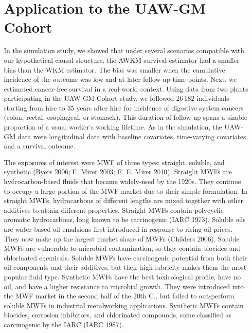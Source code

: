 \documentclass[
  11pt,
]{article}
\begin{document}
\hypertarget{application-to-the-uaw-gm-cohort}{%
\section{Application to the UAW-GM
Cohort}\label{application-to-the-uaw-gm-cohort}}

In the simulation study, we showed that under several scenarios
compatible with our hypothetical causal structure, the AWKM survival
estimator had a smaller bias than the WKM estimator. The bias was
smaller when the cumulative incidence of the outcome was low and at
later follow-up time points. Next, we estimated cancer-free survival in
a real-world context. Using data from two plants participating in the
UAW-GM Cohort study, we followed \(26\,182\) individuals starting from
hire to 35 years after hire for incidence of digestive system cancers
(colon, rectal, esophageal, or stomach). This duration of follow-up
spans a sizable proportion of a usual worker's working lifetime. As in
the simulation, the UAW-GM data were longitudinal data with baseline
covariates, time-varying covariates, and a survival outcome.

The exposures of interest were MWF of three types: straight, soluble,
and synthetic (Byers 2006; F. Mirer 2003; F. E. Mirer 2010). Straight
MWFs are hydrocarbon-based fluids that became widely-used by the 1920s.
They continue to occupy a large portion of the MWF market due to their
simple formulation. In straight MWFs, hydrocarbons of different lengths
are mixed together with other additives to attain different properties.
Straight MWFs contain polycyclic aromatic hydrocarbons, long known to be
carcinogenic (IARC 1973). Soluble oils are water-based oil emulsions
first introduced in response to rising oil prices. They now make up the
largest market share of MWFs (Childers 2006). Soluble MWFs are
vulnerable to microbial contamination, so they contain biocides and
chlorinated chemicals. Soluble MWFs have carcinogenic potential from
both their oil components and their additives, but their high lubricity
makes them the most popular fluid type. Synthetic MWFs have the best
toxicological profile, have no oil, and have a higher resistance to
microbial growth. They were introduced into the MWF market in the second
half of the 20th C., but failed to out-perform soluble MWFs in
industrial metalworking applications. Synthetic MWFs contain biocides,
corrosion inhibitors, and chlorinated compounds, some classified as
carcinogenic by the IARC (IARC 1987).
\end{document}

